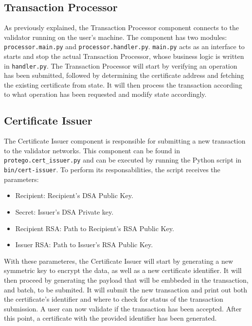 \subsection{Transaction Processor}
\label{sec:implementation-tp}

As previously explained, the Transaction Processor component connects to the validator running on the user's machine. The component has two modules: \texttt{processor.main.py} and \texttt{processor.handler.py}. \texttt{main.py} acts as an interface to starts and stop the actual Transaction Processor, whose business logic is written in \texttt{handler.py}. The Transaction Processor will start by verifying an operation has been submitted, followed by determining the certificate address and fetching the existing certificate from state. It will then process the transaction according to what operation has been requested and modify state accordingly.

\subsection{Certificate Issuer}

The Certificate Issuer component is responsible for submitting a new transaction to the validator networks. This component can be found in \texttt{protego.cert\_issuer.py} and can be executed by running the Python script in \texttt{bin/cert-issuer}. To perform its responsabilities, the script receives the parameters:

\begin{itemize}
    \item Recipient: Recipient's DSA Public Key.
    \item Secret: Issuer's DSA Private key.
    \item Recipient RSA: Path to Recipient's RSA Public Key.
    \item Issuer RSA: Path to Issuer's RSA Public Key.
\end{itemize}

With these parameteres, the Certificate Issuer will start by generating a new symmetric key to encrypt the data, as well as a new certificate identifier. It will then proceed by generating the payload that will be embbeded in the transaction, and batch, to be submited. It will submit the new transaction and print out both the certificate's identifier and where to check for status of the transaction submission. A user can now validate if the transaction has been accepted. After this point, a certificate with the provided identifier has been generated.

